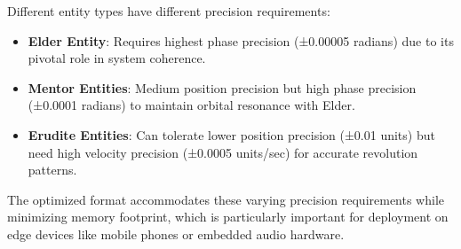 Different entity types have different precision requirements:

\begin{itemize}
    \item \textbf{Elder Entity}: Requires highest phase precision (±0.00005 radians) due to its pivotal role in system coherence.
    
    \item \textbf{Mentor Entities}: Medium position precision but high phase precision (±0.0001 radians) to maintain orbital resonance with Elder.
    
    \item \textbf{Erudite Entities}: Can tolerate lower position precision (±0.01 units) but need high velocity precision (±0.0005 units/sec) for accurate revolution patterns.
\end{itemize}

The optimized format accommodates these varying precision requirements while minimizing memory footprint, which is particularly important for deployment on edge devices like mobile phones or embedded audio hardware.
